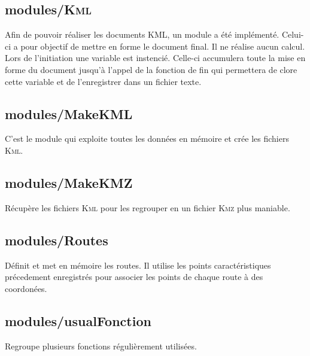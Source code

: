     \subsection{modules/\textsc{Kml}\label{pyKML}}
Afin de pouvoir réaliser les documents KML, un module a été implémenté. Celui-ci a pour objectif de mettre en forme le document final. Il ne réalise aucun calcul. Lors de l'initiation une variable est instencié. Celle-ci accumulera toute la mise en forme du document jusqu'à l'appel de la fonction de fin qui permettera de clore cette variable et de l'enregistrer dans un fichier texte.
\newpage


    \subsection{modules/MakeKML\label{pyMakeKML}} 
C'est le module qui exploite toutes les données en mémoire et crée les fichiers \textsc{Kml}.
\newpage
 
    \subsection{modules/MakeKMZ\label{pyMakeKMZ}} 
Récupère les fichiers \textsc{Kml} pour les regrouper en un fichier \textsc{Kmz} plus maniable. 
\newpage

    \subsection{modules/Routes\label{pyRoutes}} 
Définit et met en mémoire les routes. Il utilise les points caractéristiques précedement enregistrés pour associer les points de chaque route à des coordonées.
\newpage

    \subsection{modules/usualFonction\label{pyusualFonction}} 
Regroupe plusieurs fonctions régulièrement utilisées. 
\newpage






